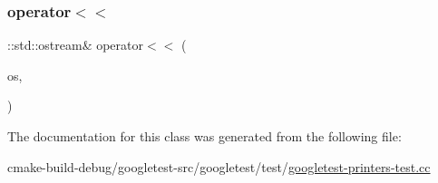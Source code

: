 \subsubsection{\texorpdfstring{operator$<$$<$}{operator<<}}
{\footnotesize\ttfamily \+::std\+::ostream\& operator$<$$<$ (\begin{DoxyParamCaption}\item[{\+::std\+::ostream \&}]{os,  }\item[{const \mbox{\hyperlink{classfoo_1_1PathLike}{Path\+Like}} \&}]{ }\end{DoxyParamCaption})\hspace{0.3cm}{\ttfamily [friend]}}



The documentation for this class was generated from the following file\+:\begin{DoxyCompactItemize}
\item 
cmake-\/build-\/debug/googletest-\/src/googletest/test/\mbox{\hyperlink{googletest-printers-test_8cc}{googletest-\/printers-\/test.\+cc}}\end{DoxyCompactItemize}
